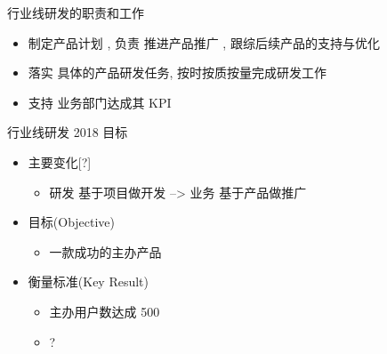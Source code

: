 \documentclass[presentation, bigger]{beamer}
\begin{document}
\begin{frame}[label={sec:orgfc14b02}]{行业线研发的职责和工作}
\begin{itemize}
\item \alert{制定产品计划} , 负责 \alert{推进产品推广} , 跟综后续产品的支持与优化
\item \alert{落实} 具体的产品研发任务, 按时按质按量完成研发工作
\item \alert{支持} 业务部门达成其 KPI
\end{itemize}
\end{frame}

\begin{frame}[label={sec:org9ec9ba9}]{行业线研发 2018 目标}
\begin{itemize}
\item 主要变化[?]
\begin{itemize}
\item 研发 \alert{基于项目做开发} --> 业务 \alert{基于产品做推广}
\end{itemize}

\item 目标(Objective)
\begin{itemize}
\item 一款成功的主办产品
\end{itemize}

\item 衡量标准(Key Result)
\begin{itemize}
\item 主办用户数达成 500
\item ?
\end{itemize}
\end{itemize}
\end{frame}
\end{document}
